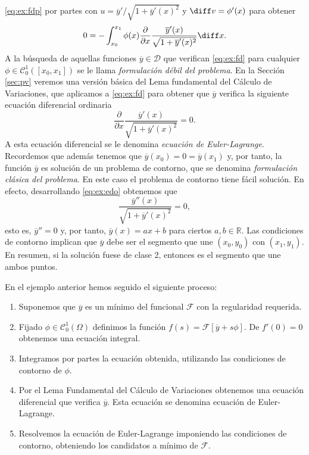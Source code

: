 \documentclass{article}
\begin{document}
\begin{ex}
  \eqref{eq:ex:fdp} por partes con $u = \overline{y}'/\sqrt{1 + \overline{y}'(x)^2}$ y
  $\diff v = \phi'(x)$ para obtener
  \begin{equation} \label{eq:ex:fd} 0 = -\int_{x_0}^{x_1} \phi(x) \frac{\partial}{\partial
      x}\frac{\overline{y}'(x)}{\sqrt{1 + \overline{y}'(x)^2}} \diff x.
  \end{equation}
  A la búsqueda de aquellas funciones $\overline{y} \in \mathcal{D}$ que verifican \eqref{eq:ex:fd}
  para cualquier $\phi \in \mathcal{C}^1_0([x_0, x_1])$ se le llama \emph{formulación débil del
    problema}. En la Sección \ref{sec:pv} veremos una versión básica del Lema fundamental del
  Cálculo de Variaciones, que aplicamos a \eqref{eq:ex:fd} para obtener que $\overline{y}$ verifica
  la siguiente ecuación diferencial ordinaria
  \begin{equation} \label{eq:ex:edo} \frac{\partial}{\partial x}\frac{\overline{y}'(x)}{\sqrt{1 +
        \overline{y}'(x)^2}} = 0.
  \end{equation}
  A esta ecuación diferencial se le denomina \emph{ecuación de Euler-Lagrange}. Recordemos que
  además tenemos que $\overline{y}(x_0) = 0 = \overline{y}(x_1)$ y, por tanto, la función
  $\overline{y}$ es solución de un problema de contorno, que se denomina \emph{formulación clásica
    del problema}. En este caso el problema de contorno tiene fácil solución. En efecto,
  desarrollando \eqref{eq:ex:edo} obtenemos que
  \[ \frac{\overline{y}''(x)}{\sqrt{1 + \overline{y}'(x)^2}} = 0,\]
  esto es, $\overline{y}'' = 0$ y, por tanto, $\overline{y}(x) = ax+b$ para ciertos
  $a, b \in \mathbb{R}$. Las condiciones de contorno implican que $\overline{y}$ debe ser el
  segmento que une $(x_0, y_0)$ con $(x_1, y_1)$. En resumen, si la solución fuese de clase 2,
  entonces es el segmento que une ambos puntos.
\end{ex}

En el ejemplo anterior hemos seguido el siguiente proceso:
\begin{enumerate}
\item Suponemos que $\overline{y}$ es un mínimo del funcional $\mathcal{F}$ con la regularidad
  requerida.
\item Fijado $\phi \in \mathcal{C}_0^1(\Omega)$ definimos la función
  $f(s) = \mathcal{F}[\overline{y} + s \phi]$. De $f'(0) = 0$ obtenemos una ecuación integral.
\item Integramos por partes la ecuación obtenida, utilizando las condiciones de contorno de $\phi$.
\item Por el Lema Fundamental del Cálculo de Variaciones obtenemos una ecuación diferencial que
  verifica $\overline{y}$. Esta ecuación se denomina ecuación de Euler-Lagrange.
\item\label{item:candidatos} Resolvemos la ecuación de Euler-Lagrange imponiendo las condiciones de
  contorno, obteniendo los candidatos a mínimo de $\mathcal{F}$.
\end{enumerate}
\end{document}
